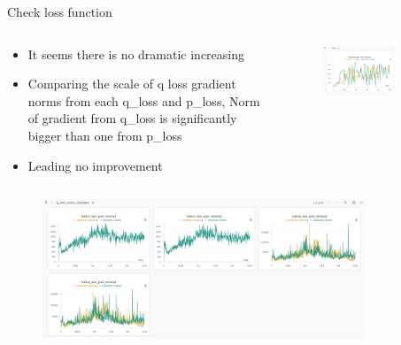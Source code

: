 \documentclass[8pt]{beamer}
\begin{document}
\begin{frame}{Check loss function}
    \begin{columns}
        \begin{column}{0.5\textwidth}
            \begin{itemize}
                \item It seems there is no dramatic increasing
                \item Comparing the scale of q loss gradient norms from each q\_loss and p\_loss, Norm of gradient from q\_loss is significantly bigger than one from p\_loss
                \item Leading no improvement
            \end{itemize}
        \end{column}
        \begin{column}{0.5\textwidth}
            \begin{figure}
                \includegraphics[width=0.75\textwidth]{NoBigDiffafterLossFix.png}
            \end{figure}
        \end{column}
    \end{columns}
    \begin{figure}
        \includegraphics[width=0.86\textwidth]{CompareQGradNorm.png}
    \end{figure}
\end{frame}
\end{document}
